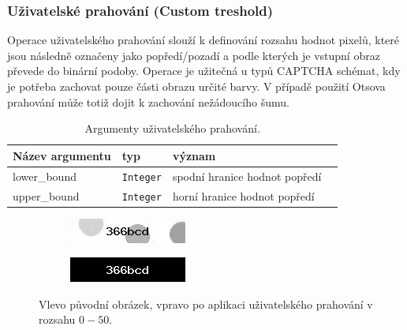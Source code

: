 \documentclass[
  field=ainfp,
  master=true,
  biblatex,
  sourcecodes=false,
  theorems=false,
  glossaries,
  index
]{kidiplom}
\begin{document}
\subsubsection*{Uživatelské prahování (Custom treshold)}
Operace uživatelského prahování slouží k definování rozsahu hodnot pixelů, které jsou následně označeny jako popředí/pozadí a podle kterých je vstupní obraz převede do binární podoby. Operace je užitečná u typů CAPTCHA schémat, kdy je potřeba zachovat pouze části obrazu určité barvy. V případě použití Otsova prahování může totiž dojit k zachování nežádoucího šumu.

\begin{table}[H]
\centering
\begin{tabular}{|l|l|l|l|}
\hline
\textbf{Název argumentu} & \textbf{typ} & \textbf{význam}
\\ \hline
lower\_bound & \texttt{Integer} & spodní hranice hodnot popředí
\\ \hline
upper\_bound & \texttt{Integer} & horní hranice hodnot popředí
\\ \hline
\end{tabular}
\caption{Argumenty uživatelského prahování.}
\end{table}


\begin{figure}[H]
\centering
\begin{subfigure}{.5\textwidth}
  \centering
  \includegraphics[width=.8\linewidth]{images/custom_original.png}
\end{subfigure}%
\begin{subfigure}{.5\textwidth}
  \centering
  \includegraphics[width=.8\linewidth]{images/custom_result_0_50.png}
\end{subfigure}
\caption{Vlevo původní obrázek, vpravo po aplikaci uživatelského prahování v rozsahu $0 - 50$.}
\label{fig:inverse_example}
\end{figure}
\end{document}
